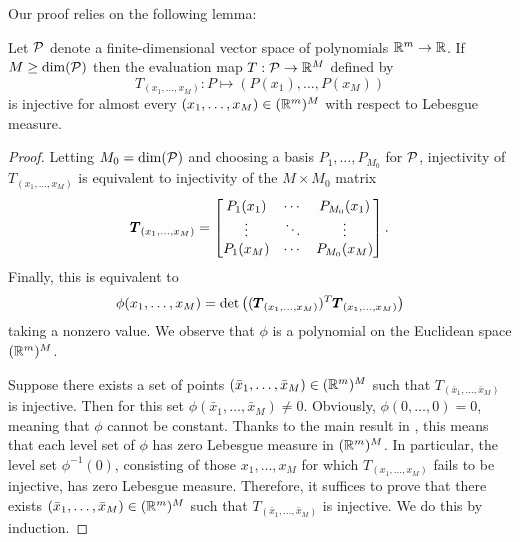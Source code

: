 \documentclass[twoside,11pt]{article}
\begin{document}
Our proof relies on the following lemma:
\begin{lemma}
    \label{lem:generic_polynomial_sampling}
    Let ${\mathcal{P}}$ denote a finite-dimensional vector space of polynomials $\mathbb{R}^m \to \mathbb{R}$.
    If $M \geq \dim ({\mathcal{P}})$ then the evaluation map $T:{\mathcal{P}} \to \mathbb{R}^M$ defined by
    \begin{equation}
        T_{(x_1, \ldots, x_M)}: P \mapsto (P(x_1), \ldots, P(x_M))
    \end{equation}
    is injective for almost every $(x_1, \ldots, x_M) \in (\mathbb{R}^m)^M$ with respect to Lebesgue measure.
\end{lemma}
\begin{proof}
    Letting $M_0 = \dim({\mathcal{P}})$ and
    choosing a basis $P_1, \ldots, P_{M_0}$ for ${\mathcal{P}}$, injectivity of $T_{(x_1, \ldots, x_M)}$ is equivalent to injectivity of the $M\times M_0$ matrix 
    \begin{equation}
        {\pmb{T}}_{(x_1, \ldots, x_M)}
        = \begin{bmatrix}
        P_1(x_1) & \cdots & P_{M_0}(x_1) \\
        \vdots & \ddots & \vdots \\
        P_1(x_M) & \cdots & P_{M_0}(x_M)
        \end{bmatrix}.
    \end{equation}
    Finally, this is equivalent to
    \begin{equation}
        \phi(x_1, \ldots, x_M) = \det\big( ({\pmb{T}}_{(x_1, \ldots, x_M)})^T {\pmb{T}}_{(x_1, \ldots, x_M)} \big)
    \end{equation}
    taking a nonzero value.
    We observe that $\phi$ is a polynomial on the Euclidean space $(\mathbb{R}^{m})^M$.
    
    Suppose there exists a set of points $(\bar{x}_1, \ldots, \bar{x}_M)\in(\mathbb{R}^m)^M$ such that $T_{(\bar{x}_1, \ldots, \bar{x}_M)}$ is injective.
    Then for this set $\phi(\bar{x}_1, \ldots, \bar{x}_M) \neq 0$.
    Obviously, $\phi(0, \ldots, 0) = 0$, meaning that $\phi$ cannot be constant.
    Thanks to the main result in \cite{Caron2005zero}, this means that each level set of $\phi$ has zero Lebesgue measure in $(\mathbb{R}^{m})^M$. 
    In particular, the level set $\phi^{-1}(0)$, consisting of those $x_1, \ldots, x_M$ for which $T_{(x_1, \ldots, x_M)}$ fails to be injective, has zero Lebesgue measure.
    Therefore, it suffices to prove that there exists $(\bar{x}_1, \ldots, \bar{x}_M)\in(\mathbb{R}^m)^M$ such that $T_{(\bar{x}_1, \ldots, \bar{x}_M)}$ is injective.
    We do this by induction.
    

\end{proof}
\end{document}
